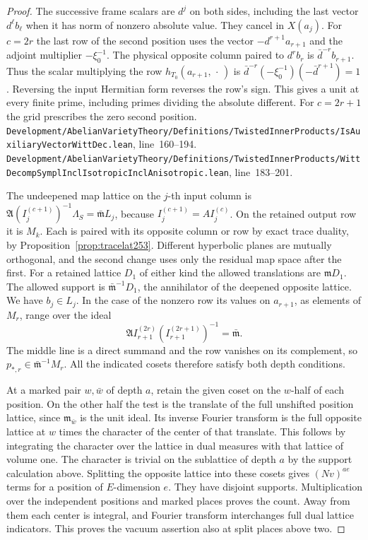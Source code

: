 \documentclass[a4paper,11pt]{article}
\theoremstyle{definition}
\theoremstyle{remark}
\newcommand{\srcloc}[2]{{\small\nolinkurl{#1.lean}}, line~#2}
\numberwithin{equation}{section}
\begin{document}
\begin{proof}
The successive frame scalars are \(d^j\) on both sides, including
the last vector \(d^\ell b_\ell\) when it has norm of nonzero
absolute value. They cancel in \(X(a_j)\). For \(c=2r\) the last
row of the second position uses the vector \(-d^{r+1}a_{r+1}\)
and the adjoint multiplier \(-\xi_0^{-1}\). The physical opposite
column paired to \(d^r b_r\) is
\(\bar d^{-r}b_{r+1}\). Thus the scalar multiplying the row
\(h_{T_0}(a_{r+1},\,\cdot\,)\) is
\(\bar d^{-r}(-\xi_0^{-1})(-\bar d^{r+1})=1\).
Reversing the input Hermitian form reverses the row's sign.
This gives a unit at every finite prime, including primes
dividing the absolute different. For \(c=2r+1\) the grid
prescribes the zero second position.
\srcloc{Development/AbelianVarietyTheory/Definitions/TwistedInnerProducts/IsAuxiliaryVectorWittDec}{160--194}.
\srcloc{Development/AbelianVarietyTheory/Definitions/TwistedInnerProducts/WittDecompSymplInclIsotropicInclAnisotropic}{183--201}.

The undeepened map lattice on the \(j\)-th input column is
\(\mathfrak A(I_j^{(c+1)})^{-1}\Lambda_S=\bar{\mathfrak m}L_j\),
because \(I_j^{(c+1)}=A I_j^{(c)}\). On the retained output row
it is \(M_k\). Each is paired with its opposite column or row by
exact trace duality, by Proposition~\ref{prop:tracelat253}.
Different hyperbolic planes are mutually orthogonal, and the
second change uses only the residual map space after the first.
For a retained lattice \(D_1\) of either kind the allowed
translations are \(\mathfrak m D_1\). The allowed support is
\(\bar{\mathfrak m}^{-1}D_1\), the annihilator of the deepened
opposite lattice. We have \(b_j\in L_j\). In the case of the
nonzero row its values on \(a_{r+1}\), as elements of \(M_r\),
range over the ideal
\[
  \mathfrak A I_{r+1}^{(2r)}(I_{r+1}^{(2r+1)})^{-1}
      =\bar{\mathfrak m}.
\]
The middle line is a direct summand and the row vanishes on its
complement, so \(p_{*,r}\in\bar{\mathfrak m}^{-1}M_r\).
All the indicated cosets therefore satisfy both depth conditions.

At a marked pair \(w,\bar w\) of depth \(a\), retain the given
coset on the \(w\)-half of each position. On the other half the
test is the translate of the full unshifted position lattice,
since \(\mathfrak m_{\bar w}\) is the unit ideal. Its inverse
Fourier transform is the full opposite lattice at \(w\) times
the character of the center of that translate. This follows by
integrating the character over the lattice in dual measures
with that lattice of volume one. The character is trivial on
the sublattice of depth \(a\) by the support calculation above.
Splitting the opposite lattice into these cosets gives \((Nv)^{a e}\)
terms for a position of \(E\)-dimension \(e\). They have disjoint
supports. Multiplication over the independent positions and
marked places proves the count. Away from them each center is
integral, and Fourier transform interchanges full dual lattice
indicators. This proves the vacuum assertion also at split
places above two.
\end{proof}
\end{document}
